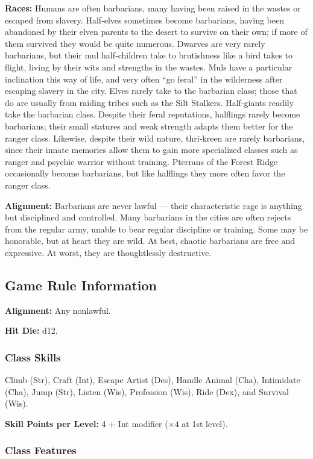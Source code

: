 \textbf{Races:} Humans are often barbarians, many having been raised in the wastes or escaped from slavery. Half‐elves sometimes become barbarians, having been abandoned by their elven parents to the desert to survive on their own; if more of them survived they would be quite numerous. Dwarves are very rarely barbarians, but their mul half‐children take to brutishness like a bird takes to flight, living by their wits and strengths in the wastes. Muls have a particular inclination this way of life, and very often ``go feral'' in the wilderness after escaping slavery in the city. Elves rarely take to the barbarian class; those that do are usually from raiding tribes such as the Silt Stalkers. Half‐giants readily take the barbarian class. Despite their feral reputations, halflings rarely become barbarians; their small statures and weak strength adapts them better for the ranger class. Likewise, despite their wild nature, thri‐kreen are rarely barbarians, since their innate memories allow them to gain more specialized classes such as ranger and psychic warrior without training. Pterrans of the Forest Ridge occasionally become barbarians, but like halflings they more often favor the ranger class.

\textbf{Alignment:} Barbarians are never lawful — their characteristic rage is anything but disciplined and controlled. Many barbarians in the cities are often rejects from the regular army, unable to bear regular discipline or training. Some may be honorable, but at heart they are wild. At best, chaotic barbarians are free and expressive. At worst, they are thoughtlessly destructive.

\subsection{Game Rule Information}
\textbf{Alignment:} Any nonlawful.

\textbf{Hit Die:} d12.

\subsubsection{Class Skills}
Climb (Str), Craft (Int), Escape Artist (Des), Handle Animal (Cha), Intimidate (Cha), Jump (Str), Listen (Wis), Profession (Wis), Ride (Dex), and Survival (Wis).

\textbf{Skill Points per Level:} 4 + Int modifier ($\times4$ at 1st level).

\subsubsection{Class Features}

